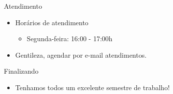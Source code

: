 \begin{frame}{Atendimento}

    \begin{itemize}

        \item
        Horários de atendimento

        \begin{itemize}

            \item
            Segunda-feira: 16:00 - 17:00h
        \end{itemize}
        \item
        Gentileza, agendar por e-mail atendimentos.
    \end{itemize}
\end{frame}

\begin{frame}{Finalizando}

    \begin{itemize}

        \item
        Tenhamos todos um excelente semestre de trabalho!
    \end{itemize}
\end{frame}
